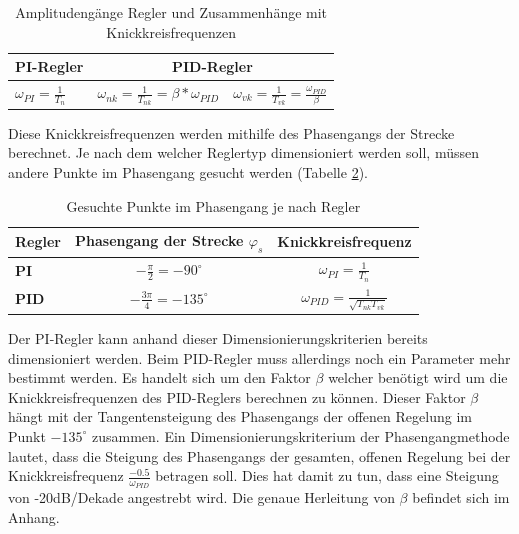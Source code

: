 \begin{table}[h]
\centering
\renewcommand*{\arraystretch}{1.7}
\begin{tabular}{|l|l|c|}
\hline 
\textbf{PI-Regler} & \multicolumn{2}{c|}{\textbf{PID-Regler}} \\ 
\hline 
$\omega_{PI}=\frac{1}{T_n}$ & $\omega_{nk}=\frac{1}{T_{nk}}=\beta*\omega_{PID}$ & $\omega_{vk}=\frac{1}{T_{vk}}=\frac{\omega_{PID}}{\beta}$ \\ 
\hline 
\end{tabular}
\caption[Amplitudengänge / Knickkreisfrequenzen]{Amplitudengänge Regler und Zusammenhänge mit Knickkreisfrequenzen}
\label{amplitudengaenge}
\renewcommand*{\arraystretch}{1} 
\end{table}

\newpage
Diese Knickkreisfrequenzen werden mithilfe des Phasengangs der Strecke berechnet. Je nach dem welcher Reglertyp dimensioniert werden soll, müssen andere Punkte im Phasengang gesucht werden (Tabelle \ref{phgangpunkte}).\newline

\begin{table}[h]
\centering
\renewcommand*{\arraystretch}{1.7}
\begin{tabular}{|l|c|c|}
\hline 
\textbf{Regler} & \textbf{Phasengang der Strecke $\varphi_s$} & \textbf{Knickkreisfrequenz}  \\ 
\hline 
\textbf{PI} & $-\frac{\pi}{2}=-90^\circ$ & $\omega_{PI}=\frac{1}{T_n}$ \\ 
\hline 
\textbf{PID} & $-\frac{3\pi}{4}=-135^\circ$ & $\omega_{PID}=\frac{1}{\sqrt{T_{nk}T_{vk}}}$ \\ 
\hline 
\end{tabular}
\caption[Wichtige Phasengangpunkte]{Gesuchte Punkte im Phasengang je nach Regler}
\label{phgangpunkte}
\renewcommand*{\arraystretch}{1} 
\end{table}

\newpage
Der PI-Regler kann anhand dieser Dimensionierungskriterien bereits dimensioniert werden. Beim PID-Regler muss allerdings noch ein Parameter mehr bestimmt werden. Es handelt sich um den Faktor $\beta$ welcher benötigt wird um die Knickkreisfrequenzen des PID-Reglers berechnen zu können. Dieser Faktor $\beta$ hängt mit der Tangentensteigung des Phasengangs der offenen Regelung im Punkt $-135^\circ$ zusammen.\newline
Ein Dimensionierungskriterium der Phasengangmethode lautet, dass die Steigung des Phasengangs der gesamten, offenen Regelung bei der Knickkreisfrequenz $\frac{-0.5}{\omega_{PID}}$ betragen soll. Dies hat damit zu tun, dass eine Steigung von -20dB/Dekade angestrebt wird. Die genaue Herleitung von $\beta$ befindet sich im Anhang. \newline

